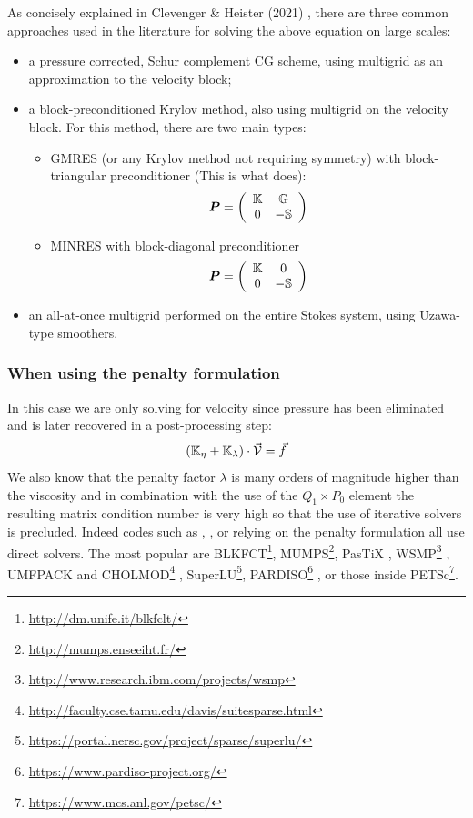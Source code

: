 As concisely explained in Clevenger \& Heister (2021) \cite{clhe21}, 
there are three common approaches used in the literature for solving the above equation on large scales:
\begin{itemize}
\item a pressure corrected, Schur complement CG scheme, using multigrid as an 
approximation to the velocity block;
\item a block-preconditioned Krylov
method, also using multigrid on the velocity block.
For this method, there are two main types:
\begin{itemize}
\item GMRES\cite{mabl15,rumi15} (or any Krylov method not requiring symmetry) with
block-triangular preconditioner (This is what \aspect does):
\[
{\bm P} = \left(
\begin{array}{cc}
{\mathbb{K}} & {\mathbb{G}} \\
0 & - {\mathbb{S}}
\end{array}
\right)
\]

\item MINRES\cite{gmhj16} with block-diagonal preconditioner
\[
{\bm P} = \left(
\begin{array}{cc}
{\mathbb{K}} & 0 \\
0 & - {\mathbb{S}}
\end{array}
\right)
\]

\end{itemize}


\item an all-at-once multigrid performed on the entire Stokes
system, using Uzawa-type smoothers.
\end{itemize}



\subsubsection{When using the penalty formulation}

In this case we are only solving for 
velocity since pressure has been eliminated and is later recovered in a post-processing step:
\[
({\mathbb{K}}_\eta+{\mathbb{K}}_\lambda) \cdot \vec {\cal V} = \vec f
\]
 We also know that 
the penalty factor $\lambda$ is many orders of magnitude higher than the viscosity and 
in combination with the use of the $Q_1 \times P_0$ element the resulting matrix 
condition number is very high so that the use of iterative solvers is precluded. 
Indeed codes such as \sopale \cite{full95}, \douar \cite{brtf08}, \fantom \cite{thie11} 
or \sulec \cite{qube11} relying on the penalty formulation all use direct solvers.
The most popular are BLKFCT\footnote{\url{http://dm.unife.it/blkfclt/}}, 
MUMPS\footnote{\url{http://mumps.enseeiht.fr/}}\cite{amdu89,amdl00,amdk01,amgl06,ambl19}, 
PasTiX \cite{herr02},
WSMP\footnote{\url{http://www.research.ibm.com/projects/wsmp}} \cite{GUPTA94ieee,GUPTA09sc-long},
UMFPACK and CHOLMOD\footnote{\url{http://faculty.cse.tamu.edu/davis/suitesparse.html}}
, SuperLU\footnote{\url{https://portal.nersc.gov/project/sparse/superlu/}}, 
PARDISO\footnote{\url{https://www.pardiso-project.org/}}
\cite{pardiso-6.0a,pardiso-6.0b,pardiso-6.0c}, or those inside 
PETSc\footnote{\url{https://www.mcs.anl.gov/petsc/}}.

